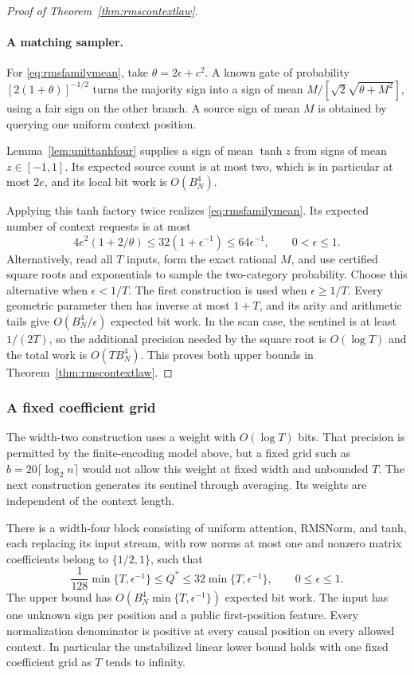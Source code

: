 \begin{proof}[Proof of Theorem~\ref{thm:rmscontextlaw}]
\paragraph{A matching sampler.}
For \eqref{eq:rmsfamilymean}, take $\theta=2\epsilon+c^2$.
A known gate of probability
$[2(1+\theta)]^{-1/2}$ turns the majority sign into a sign of
mean $M/[\sqrt2\sqrt{\theta+M^2}]$, using a fair sign on the
other branch. A source sign of mean $M$ is obtained by querying
one uniform context position.

Lemma~\ref{lem:unittanhfour} supplies a sign of mean $\tanh z$
from signs of mean $z\in[-1,1]$. Its expected source count is at
most two, which is in particular at most $2e$, and its local bit
work is $O(B_N^4)$.

Applying this tanh factory twice realizes
\eqref{eq:rmsfamilymean}. Its expected number of context
requests is at most
\[
 4e^2(1+2/\theta)
 \le32(1+\epsilon^{-1})
 \le64\epsilon^{-1},\qquad 0<\epsilon\le1.
\]
Alternatively, read all $T$ inputs, form the exact rational
$M$, and use certified square roots and exponentials to
sample the two-category probability. Choose this alternative
when $\epsilon<1/T$. The first construction is used when
$\epsilon\ge1/T$. Every geometric parameter then has inverse
at most $1+T$, and its arity and arithmetic tails give
$O(B_N^4/\epsilon)$ expected bit work. In the scan case,
the sentinel is at least $1/(2T)$, so the additional precision
needed by the square root is $O(\log T)$ and the total work
is $O(TB_N^4)$. This proves both upper bounds in
Theorem~\ref{thm:rmscontextlaw}.
\end{proof}

\subsubsection{A fixed coefficient grid}

The width-two construction uses a weight with $O(\log T)$ bits.
That precision is permitted by the finite-encoding model above,
but a fixed grid such as $b=20\lceil\log_2n\rceil$
would not allow this weight at fixed width and unbounded $T$.
The next construction generates its sentinel through averaging.
Its weights are independent of the context length.

\begin{corollary}
\label{cor:rmsfixedgrid}
There is a width-four block consisting of uniform attention, RMSNorm,
and tanh, each replacing its input stream, with row norms at most
one and nonzero matrix
coefficients belong to $\{1/2,1\}$, such that
\begin{equation}
 \frac1{128}\min\{T,\epsilon^{-1}\}
 \le Q^*\le32\min\{T,\epsilon^{-1}\},
 \qquad 0\le\epsilon\le1.
 \label{eq:rmsfixedgridlaw}
\end{equation}
The upper bound has
$O(B_N^4\min\{T,\epsilon^{-1}\})$ expected bit work. The
input has one unknown sign per position and a public
first-position feature. Every normalization denominator is
positive at every causal position on every allowed context.
In particular the unstabilized linear lower bound holds with
one fixed coefficient grid as $T$ tends to infinity.
\end{corollary}
